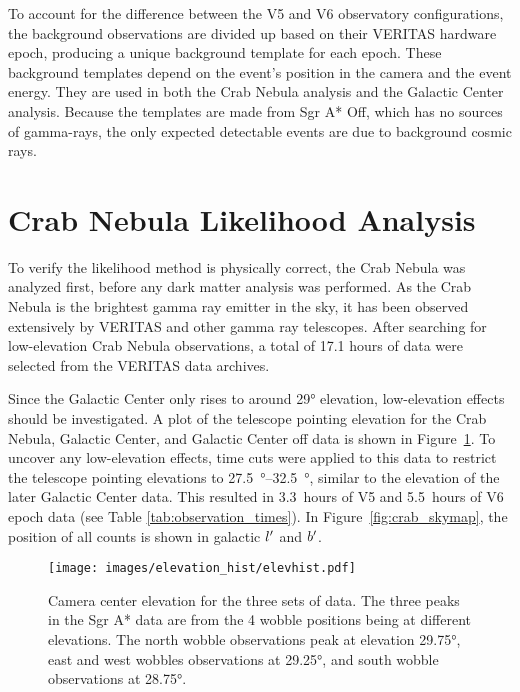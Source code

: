 To account for the difference between the V5 and V6 observatory configurations, the background observations are divided up based on their VERITAS hardware epoch, producing a unique background template for each epoch.
These background templates depend on the event's position in the camera and the event energy.
They are used in both the Crab Nebula analysis and the Galactic Center analysis.
Because the templates are made from Sgr A* Off, which has no sources of gamma-rays, the only expected detectable events are due to background cosmic rays.

\section{Crab Nebula Likelihood Analysis}\label{sec:crab_analysis}
To verify the likelihood method is physically correct, the Crab Nebula was analyzed first, before any dark matter analysis was performed.
As the Crab Nebula is the brightest gamma ray emitter in the sky, it has been observed extensively by VERITAS and other gamma ray telescopes.
After searching for low-elevation Crab Nebula observations, a total of 17.1 hours of data were selected from the VERITAS data archives.

Since the Galactic Center only rises to around \ang{29} elevation, low-elevation effects should be investigated.
A plot of the telescope pointing elevation for the Crab Nebula, Galactic Center, and Galactic Center off data is shown in Figure~\ref{fig:datapointingelevations}.
To uncover any low-elevation effects, time cuts were applied to this data to restrict the telescope pointing elevations to \SIrange{27.5}{32.5}{\degree}, similar to the elevation of the later Galactic Center data.
This resulted in \SI{3.3}{hours} of V5 and \SI{5.5}{hours} of V6 epoch data (see Table \ref{tab:observation_times}).
In Figure~\ref{fig:crab_skymap}, the position of all counts is shown in galactic $l'$ and $b'$.

\begin{figure}[hb]
  \centering
  \texttt{[image: images/elevation\_hist/elevhist.pdf]}
  \caption[VERITAS Data Elevation Exposure]{
    Camera center elevation for the three sets of data.
    The three peaks in the Sgr A* data are from the 4 wobble positions being at different elevations.
    The north wobble observations peak at elevation \nicetilde\ang{29.75}, east and west wobbles observations at \nicetilde\ang{29.25}, and south wobble observations at \nicetilde\ang{28.75}.
  }
  \label{fig:datapointingelevations}
\end{figure}

